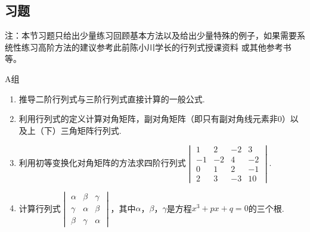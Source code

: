 \subsection{习题}
注：本节习题只给出少量练习回顾基本方法以及给出少量特殊的例子，如果需要系统性练习高阶方法的建议参考此前陈小川学长的行列式授课资料
或其他参考书等。

\centerline{\heiti A组}
\begin{enumerate}
	\item 推导二阶行列式与三阶行列式直接计算的一般公式.
	\item 利用行列式的定义计算对角矩阵，副对角矩阵（即只有副对角线元素非0）以及上（下）三角矩阵行列式.
	\item 利用初等变换化对角矩阵的方法求四阶行列式$\begin{vmatrix}
		1 & 2 & -2 & 3 \\ -1 & -2 & 4 & -2 \\ 0 & 1 & 2 & -1 \\ 2 & 3 & -3 & 10
	\end{vmatrix}$.
	\item 计算行列式$\begin{vmatrix}
		\alpha & \beta & \gamma \\
		\gamma & \alpha & \beta \\
		\beta & \gamma & \alpha
	\end{vmatrix}$，其中$\alpha$，$\beta$，$\gamma$是方程$x^3+px+q=0$的三个根.
\end{enumerate}


